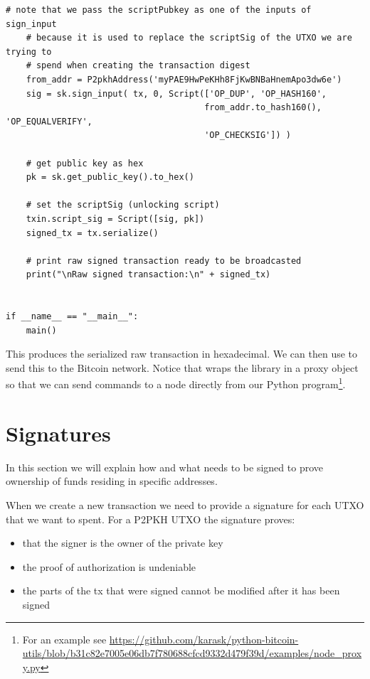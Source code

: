 \begin{lstlisting}[style=Python]
    # note that we pass the scriptPubkey as one of the inputs of sign_input
    # because it is used to replace the scriptSig of the UTXO we are trying to
    # spend when creating the transaction digest
    from_addr = P2pkhAddress('myPAE9HwPeKHh8FjKwBNBaHnemApo3dw6e')
    sig = sk.sign_input( tx, 0, Script(['OP_DUP', 'OP_HASH160',
                                       from_addr.to_hash160(), 'OP_EQUALVERIFY',
                                       'OP_CHECKSIG']) )

    # get public key as hex
    pk = sk.get_public_key().to_hex()

    # set the scriptSig (unlocking script)
    txin.script_sig = Script([sig, pk])
    signed_tx = tx.serialize()

    # print raw signed transaction ready to be broadcasted
    print("\nRaw signed transaction:\n" + signed_tx)


if __name__ == "__main__":
    main()
\end{lstlisting}
\vspace{1em}

This produces the serialized raw transaction in hexadecimal. We can then use  to send this to the Bitcoin network. Notice that  wraps the  library in a proxy object so that we can send commands to a node directly from our Python program\footnote{For an example see \url{https://github.com/karask/python-bitcoin-utils/blob/b31c82e7005e06db7f780688cfcd9332d479f39d/examples/node_proxy.py}}.



\section{Signatures}
\label{sec:signatures}

In this section we will explain how and what needs to be signed to prove ownership of funds residing in specific addresses. 

When we create a new transaction we need to provide a signature for each UTXO that we want to spent. For a P2PKH UTXO the signature proves:

\begin{itemize}
\item that the signer is the owner of the private key
\item the proof of authorization is undeniable
\item the parts of the tx that were signed cannot be modified after it has been signed
\end{itemize}


